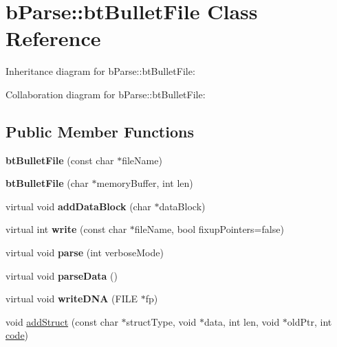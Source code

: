 \hypertarget{classb_parse_1_1bt_bullet_file}{\section{b\+Parse\+:\+:bt\+Bullet\+File Class Reference}
\label{classb_parse_1_1bt_bullet_file}
}


Inheritance diagram for b\+Parse\+:\+:bt\+Bullet\+File\+:


Collaboration diagram for b\+Parse\+:\+:bt\+Bullet\+File\+:
\subsection*{Public Member Functions}
\begin{DoxyCompactItemize}
\item 
\hypertarget{classb_parse_1_1bt_bullet_file_aea24b70a4b189cd0670501f74b0ad4b3}{{\bfseries bt\+Bullet\+File} (const char $\ast$file\+Name)}\label{classb_parse_1_1bt_bullet_file_aea24b70a4b189cd0670501f74b0ad4b3}

\item 
\hypertarget{classb_parse_1_1bt_bullet_file_a0f442fd0003086803f3d76c15bc57e62}{{\bfseries bt\+Bullet\+File} (char $\ast$memory\+Buffer, int len)}\label{classb_parse_1_1bt_bullet_file_a0f442fd0003086803f3d76c15bc57e62}

\item 
\hypertarget{classb_parse_1_1bt_bullet_file_a3519c6c22b4257ab1c5fb457ab851aeb}{virtual void {\bfseries add\+Data\+Block} (char $\ast$data\+Block)}\label{classb_parse_1_1bt_bullet_file_a3519c6c22b4257ab1c5fb457ab851aeb}

\item 
\hypertarget{classb_parse_1_1bt_bullet_file_a549f71bacece2493ef2e0261c4bed601}{virtual int {\bfseries write} (const char $\ast$file\+Name, bool fixup\+Pointers=false)}\label{classb_parse_1_1bt_bullet_file_a549f71bacece2493ef2e0261c4bed601}

\item 
\hypertarget{classb_parse_1_1bt_bullet_file_a169b1e8721871abb422c67d2f510336b}{virtual void {\bfseries parse} (int verbose\+Mode)}\label{classb_parse_1_1bt_bullet_file_a169b1e8721871abb422c67d2f510336b}

\item 
\hypertarget{classb_parse_1_1bt_bullet_file_a9c31107516ec2bfbb999b39f405bee84}{virtual void {\bfseries parse\+Data} ()}\label{classb_parse_1_1bt_bullet_file_a9c31107516ec2bfbb999b39f405bee84}

\item 
\hypertarget{classb_parse_1_1bt_bullet_file_ac3b43093d07ad3fa09e3f6065497b4df}{virtual void {\bfseries write\+D\+N\+A} (F\+I\+L\+E $\ast$fp)}\label{classb_parse_1_1bt_bullet_file_ac3b43093d07ad3fa09e3f6065497b4df}

\item 
void \hyperlink{classb_parse_1_1bt_bullet_file_aea8c6356c4de373524ca1b680d0371dc}{add\+Struct} (const char $\ast$struct\+Type, void $\ast$data, int len, void $\ast$old\+Ptr, int \hyperlink{structcode}{code})
\end{DoxyCompactItemize}
